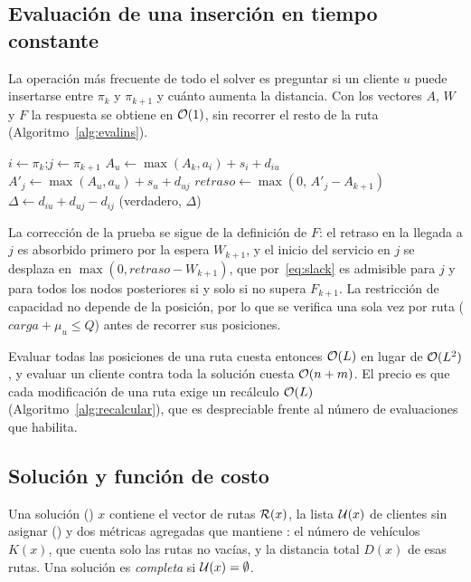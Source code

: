 \subsection{Evaluación de una inserción en tiempo constante}
\label{sec:evalins}

La operación más frecuente de todo el solver es preguntar si un cliente $u$ puede insertarse
entre $\pi_k$ y $\pi_{k+1}$ y cuánto aumenta la distancia. Con los vectores $A$, $W$ y $F$ la
respuesta se obtiene en $\mathcal{O}(1)$, sin recorrer el resto de la ruta
(Algoritmo~\ref{alg:evalins}).

\begin{algorithm}[H]
\caption{ ()}
\label{alg:evalins}
$i\gets\pi_k$;\quad $j\gets\pi_{k+1}$\;
$A_u\gets\max(A_k,a_i)+s_i+d_{iu}$ 
$A'_j\gets\max(A_u,a_u)+s_u+d_{uj}$ 
$\textit{retraso}\gets\max(0,\,A'_j-A_{k+1})$\;
$\Delta\gets d_{iu}+d_{uj}-d_{ij}$\;
\Devolver (verdadero, $\Delta$)\;
\end{algorithm}

La corrección de la prueba se sigue de la definición de $F$: el retraso en la llegada a $j$
es absorbido primero por la espera $W_{k+1}$, y el inicio del servicio en $j$ se desplaza en
$\max(0,\textit{retraso}-W_{k+1})$, que por~\eqref{eq:slack} es admisible para $j$ y para todos
los nodos posteriores si y solo si no supera $F_{k+1}$. La restricción de capacidad no depende
de la posición, por lo que se verifica una sola vez por ruta
($\textit{carga}+\mu_u\le Q$) antes de recorrer sus posiciones.

Evaluar todas las posiciones de una ruta cuesta entonces $\mathcal{O}(L)$ en lugar de
$\mathcal{O}(L^2)$, y evaluar un cliente contra toda la solución cuesta $\mathcal{O}(n+m)$. El precio es
que cada modificación de una ruta exige un recálculo $\mathcal{O}(L)$
(Algoritmo~\ref{alg:recalcular}), que es despreciable frente al número de evaluaciones que
habilita.

\subsection{Solución y función de costo}

Una solución () $x$ contiene el vector de rutas $\mathcal{R}(x)$, la lista $\mathcal{U}(x)$ de
clientes sin asignar () y dos métricas agregadas que mantiene
: el número de vehículos $K(x)$, que cuenta solo las rutas no vacías, y la
distancia total $D(x)$ de esas rutas. Una solución es \emph{completa} si $\mathcal{U}(x)=\emptyset$.

